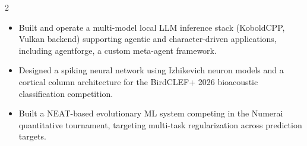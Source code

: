 \documentclass[10pt,letterpaper,ragged2e,withhyper]{altacv}
\begin{document}
\begin{paracol}{2}



\switchcolumn


\begin{itemize}
  \item Built and operate a multi-model local LLM inference stack (KoboldCPP, Vulkan backend) supporting agentic and character-driven applications, including agentforge, a custom meta-agent framework.
  \item Designed a spiking neural network using Izhikevich neuron models and a cortical column architecture for the BirdCLEF+ 2026 bioacoustic classification competition.
  \item Built a NEAT-based evolutionary ML system competing in the Numerai quantitative tournament, targeting multi-task regularization across prediction targets.
\end{itemize}

\end{paracol}






\end{document}
